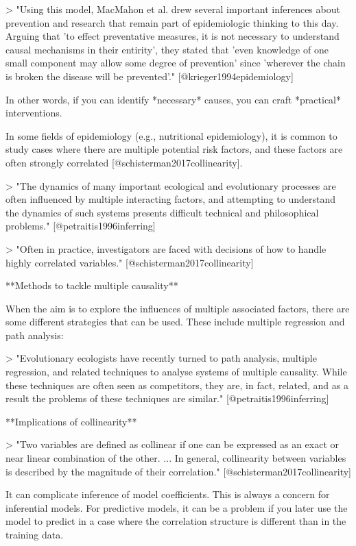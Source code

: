 > "Using this model, MacMahon et al. drew several important inferences about
prevention and research that remain part of epidemiologic thinking to this day.
Arguing that 'to effect preventative measures, it is not necessary to understand
causal mechanisms in their entirity', they stated that 'even knowledge of one
small component may allow some degree of prevention' since 'wherever the chain
is broken the disease will be prevented'." [@krieger1994epidemiology]

In other words, if you can identify *necessary* causes, you can craft 
*practical* interventions. 

In some fields of epidemiology (e.g., nutritional epidemiology), it is common 
to study cases where there are multiple potential risk factors, and these 
factors are often strongly correlated [@schisterman2017collinearity].

> "The dynamics of many important ecological and evolutionary processes are 
often influenced by multiple interacting factors, and attempting to understand 
the dynamics of such systems presents difficult technical and philosophical 
problems." [@petraitis1996inferring]

> "Often in practice, investigators are faced with decisions of how to handle
highly correlated variables." [@schisterman2017collinearity]

**Methods to tackle multiple causality**

When the aim is to explore the influences of multiple associated factors, there
are some different strategies that can be used. These include multiple
regression and path analysis:

> "Evolutionary ecologists have recently turned to path analysis, multiple
regression, and related techniques to analyse systems of multiple causality.
While these techniques are often seen as competitors, they are, in fact,
related, and as a result the problems of these techniques are similar."
[@petraitis1996inferring]

**Implications of collinearity**

> "Two variables are defined as collinear if one can be expressed as an exact
or near linear combination of the other. ... In general, collinearity between
variables is described by the magnitude of their correlation." 
[@schisterman2017collinearity]

It can complicate inference of model coefficients. This is always a concern for 
inferential models. For predictive models, it can be a problem if you later use
the model to predict in a case where the correlation structure is different than
in the training data. 

